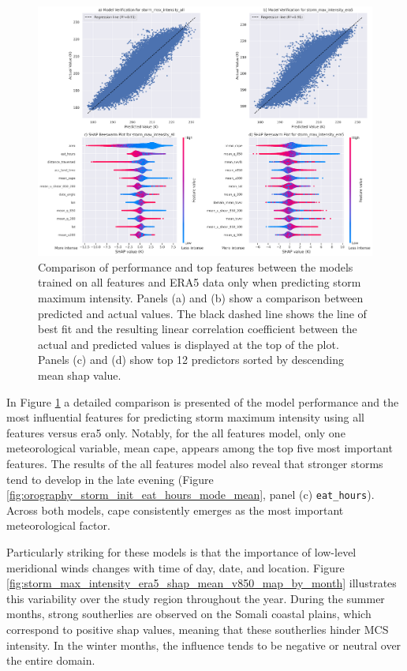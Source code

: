 \begin{figure}[ht]
    \centering
    \includegraphics[width=\textwidth]{../figures/generated/experiments/storm_max_intensity/storm_max_intensity_summary.png}
    \caption{Comparison of performance and top features between the models trained on all features and ERA5 data only when predicting storm maximum intensity. Panels (a) and (b) show a comparison between predicted and actual values. The black dashed line shows the line of best fit and the resulting linear correlation coefficient between the actual and predicted values is displayed at the top of the plot. Panels (c) and (d) show top 12 predictors sorted by descending mean \acrshort{shap} value.}
    \label{fig:storm_max_intensity_summary}
\end{figure}

In Figure \ref{fig:storm_max_intensity_summary} a detailed comparison is presented of the model performance and the most influential features for predicting storm maximum intensity using all features versus \acrshort{era5} only. Notably, for the all features model, only one meteorological variable, mean \acrshort{cape}, appears among the top five most important features. The results of the all features model also reveal that stronger storms tend to develop in the late evening (Figure \ref{fig:orography_storm_init_eat_hours_mode_mean}, panel (c) \texttt{eat\_hours}). Across both models, \acrshort{cape} consistently emerges as the most important meteorological factor.

Particularly striking for these models is that the importance of low-level meridional winds changes with time of day, date, and location. Figure \ref{fig:storm_max_intensity_era5_shap_mean_v850_map_by_month} illustrates this variability over the study region throughout the year. During the summer months, strong southerlies are observed on the Somali coastal plains, which correspond to positive shap values, meaning that these southerlies hinder MCS intensity. In the winter months, the influence tends to be negative or neutral over the entire domain.

